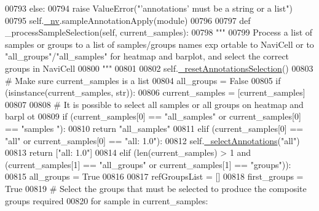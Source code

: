 \begin{DoxyCode}
00793         \textcolor{keywordflow}{else}:
00794             \textcolor{keywordflow}{raise} ValueError(\textcolor{stringliteral}{"'annotations' must be a string or a list"})
00795         self.\hyperlink{classnavicom_1_1navicom_1_1NaviCom_afff3fd56fa16a68bab52ba8d801e325a}{_nv}.sampleAnnotationApply(module)
00796 
00797     \textcolor{keyword}{def }\_processSampleSelection(self, current\_samples):
00798         \textcolor{stringliteral}{"""}
00799 \textcolor{stringliteral}{        Process a list of samples or groups to a list of samples/groups names exp
      ortable to NaviCell or to "all\_groups"/"all\_samples" for heatmap and barplot, and
       select the correct groups in NaviCell}
00800 \textcolor{stringliteral}{        """}
00801 
00802         self.\hyperlink{classnavicom_1_1navicom_1_1NaviCom_a26866ef971b6bcb8b00ca742d47d0ea9}{_resetAnnotationsSelection}()
00803         \textcolor{comment}{# Make sure current\_samples is a list}
00804         all\_groups = \textcolor{keyword}{False}
00805         \textcolor{keywordflow}{if} (isinstance(current\_samples, str)):
00806             current\_samples = [current\_samples]
00807 
00808         \textcolor{comment}{# It is possible to select all samples or all groups on heatmap and barpl
      ot}
00809         \textcolor{keywordflow}{if} (current\_samples[0] == \textcolor{stringliteral}{"all\_samples"} \textcolor{keywordflow}{or} current\_samples[0] == \textcolor{stringliteral}{"samples
      "}):
00810             \textcolor{keywordflow}{return} \textcolor{stringliteral}{"all\_samples"}
00811         \textcolor{keywordflow}{elif} (current\_samples[0] == \textcolor{stringliteral}{"all"} \textcolor{keywordflow}{or} current\_samples[0] == \textcolor{stringliteral}{"all: 1.0"}):
00812             self.\hyperlink{classnavicom_1_1navicom_1_1NaviCom_a7e1aa831f14b151b7b5787c8b6128cef}{_selectAnnotations}(\textcolor{stringliteral}{"all"})
00813             \textcolor{keywordflow}{return} [\textcolor{stringliteral}{"all: 1.0"}]
00814         \textcolor{keywordflow}{elif} (len(current\_samples) > 1 \textcolor{keywordflow}{and} (current\_samples[1] == \textcolor{stringliteral}{"all\_groups"} \textcolor{keywordflow}{or
      } current\_samples[1] == \textcolor{stringliteral}{"groups"})):
00815             all\_groups = \textcolor{keyword}{True}
00816 
00817         refGroupsList = []
00818         first\_groups = \textcolor{keyword}{True}
00819         \textcolor{comment}{# Select the groups that must be selected to produce the composite groups
       required}
00820         \textcolor{keywordflow}{for} sample \textcolor{keywordflow}{in} current\_samples:

\end{DoxyCode}
